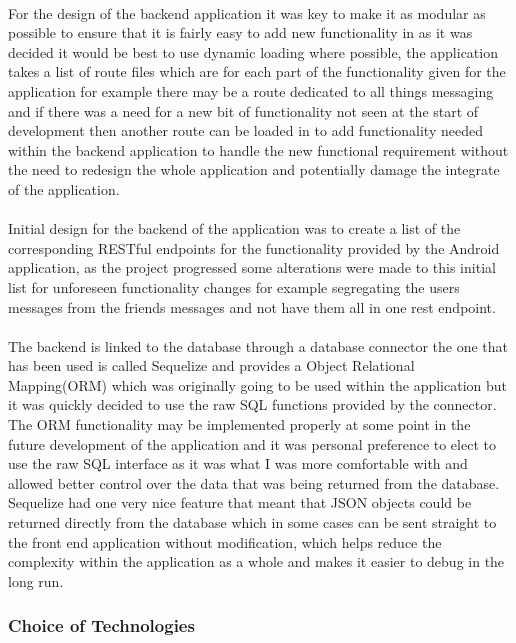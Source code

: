 \\
For the design of the backend application it was key to make it as modular as possible to ensure that it is fairly easy to add new functionality in as it was decided it would be best to use dynamic loading where possible, the application takes a list of route files which are for each part of the functionality given for the application for example there may be a route dedicated to all things messaging and if there was a need for a new bit of functionality not seen at the start of development then another route can be loaded in to add functionality needed within the backend application to handle the new functional requirement without the need to redesign the whole application and potentially damage the integrate of the application.\\
\\
Initial design for the backend of the application was to create a list of the corresponding RESTful endpoints for the functionality provided by the Android application, as the project progressed some alterations were made to this initial list for unforeseen functionality changes for example segregating the users messages from the friends messages and not have them all in one rest endpoint.\\
\\
The backend is linked to the database through a database connector the one that has been used is called Sequelize \cite{SaschaDepold:Sequelize:2015:online} and provides a Object Relational Mapping(ORM) which was originally going to be used within the application but it was quickly decided to use the raw SQL functions provided by the connector. The ORM functionality may be implemented properly at some point in the future development of the application and it was personal preference to elect to use the raw SQL interface as it was what I was more comfortable with and allowed better control over the data that was being returned from the database. Sequelize had one very nice feature that meant that JSON objects could be returned directly from the database which in some cases can be sent straight to the front end application without modification, which helps reduce the complexity within the application as a whole and makes it easier to debug in the long run.

\subsubsection*{Choice of Technologies}
\label{sec:node_choice_of_tech}

